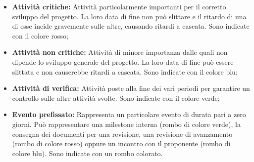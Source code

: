 \begin{itemize}
  \item \textbf{Attività critiche:} Attività particolarmente importanti per il corretto sviluppo del progetto. La loro data di fine non può slittare e il ritardo di una di esse
        incide gravemente sulle altre, causando ritardi a cascata. Sono indicate con il colore rosso;
  \item \textbf{Attività non critiche:} Attività di minore importanza dalle quali non dipende lo sviluppo generale del progetto. La loro data di fine può essere slittata e non causerebbe ritardi a cascata.
        Sono indicate con il colore blu;
  \item \textbf{Attività di verifica:} Attività poste alla fine dei vari periodi per garantire un controllo sulle altre attività svolte.
        Sono indicate con il colore verde;
  \item \textbf{Evento prefissato:} Rappresenta un particolare evento di durata pari a zero giorni. Può rappresentare una milestone\glo{} interna (rombo di colore verde), la consegna dei documenti
        per una revisione, una revisione di avanzamento (rombo di colore rosso) oppure un incontro con il
        proponente (rombo di colore blu). Sono indicate con un rombo colorato.
\end{itemize}

